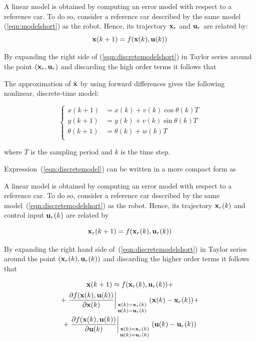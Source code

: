 \documentclass[conference]{IEEEtran} %
\begin{document}
A linear model is obtained by computing an error model with respect to a reference car. To do so, consider a reference car described by the same model (\ref{eqn:modelshort}) as the robot. Hence, its trajectory ${\bf x}_r$ and ${\bf u}_r$ are related by:
\begin{equation}
	{\bf x}(k+1)=f({\bf x}(k),{\bf u}(k))
\label{eqn:discretemodelshort}
\end{equation}

By expanding the right side of (\ref{eqn:discretemodelshort}) in Taylor series around the point $({\bf x}_r,{\bf u}_r)$ and discarding the high order terms it follows that


The approximation of $\dot{\bf x}$ by using forward differences gives the
following nonlinear, discrete-time model:

\begin{equation}
\label{eqn:discretemodel}
	\left\{
		\begin{aligned}
			x(k+1)	    &= x(k) + v(k)\cos\theta(k)T \\
			y(k+1)	    &= y(k) + v(k)\sin\theta(k)T \\
			\theta(k+1) &= \theta(k) + w(k)T \\
		\end{aligned}
	\right.
\end{equation}

\noindent where $T$ is the sampling period and $k$ is the time step.

Expression~(\ref{eqn:discretemodel}) can be written in a more compact form
as


A linear model is obtained by computing an error model with respect to a
reference car. To do so, consider a reference car described by the same
model~(\ref{eqn:discretemodelshort}) as the robot. Hence, its trajectory
${\bf x}_r(k)$ and control input ${\bf u}_r(k)$ are related by

\begin{equation}
{\bf x}_r(k+1)=f({\bf x}_r(k),{\bf u}_r(k))
\label{eqn:referencecar}
\end{equation}


By expanding the right hand side of~(\ref{eqn:discretemodelshort}) in Taylor
series around the point $({\bf x}_r(k),{\bf u}_r(k))$ and discarding the
higher order terms it follows that

\begin{multline}
\label{eqn:taylor}
{\bf x}(k+1) \approx f({\bf x}_r(k),{\bf u}_r(k)) + \\
 + \left.\frac{\partial f({\bf x}(k),{\bf u}(k))}{\partial{\bf x}(k)}\right|_{\begin{smallmatrix}{\bf x}(k)={\bf x}_r(k) \\
{\bf u}(k)={\bf u}_r(k) \end{smallmatrix}}({\bf x}(k)-{\bf x}_r(k)) + \\
+ \left.\frac{\partial f({\bf x}(k),{\bf u}(k))}{\partial{\bf u}(k)}\right|_{\begin{smallmatrix}{\bf x}(k)={\bf x}_r(k) \\
{\bf u}(k)={\bf u}_r(k) \end{smallmatrix}}({\bf u}(k)-{\bf u}_r(k))
\end{multline}
\end{document}
